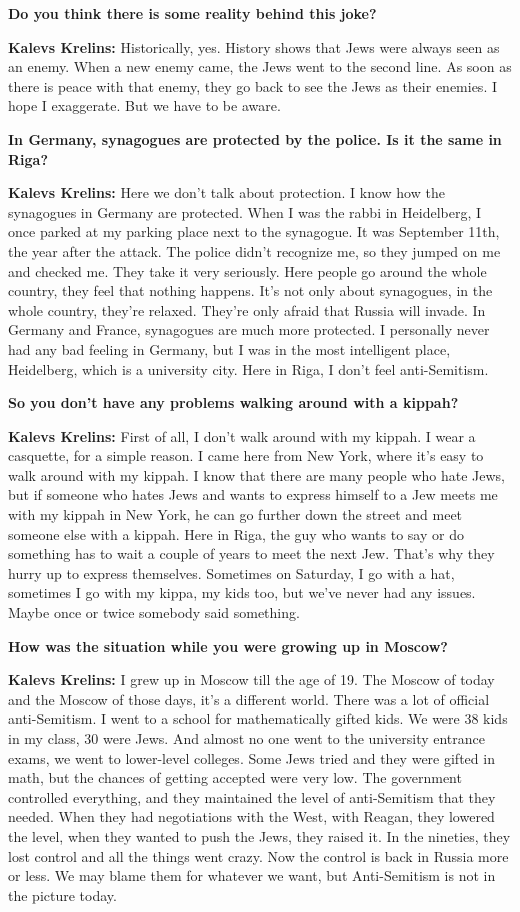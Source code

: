 \textbf{Do you think there is some reality behind this joke?}  

\textbf{Kalevs Krelins:} Historically, yes. History shows that Jews were always seen as an enemy. When a new enemy came, the Jews went to the second line. As soon as there is peace with that enemy, they go back to see the Jews as their enemies. I hope I exaggerate. But we have to be aware. 

\textbf{In Germany, synagogues are protected by the police. Is it the same in Riga?} 

\textbf{Kalevs Krelins:} Here we don’t talk about protection. I know how the synagogues in Germany are protected. When I was the rabbi in Heidelberg, I once parked at my parking place next to the synagogue. It was September 11th, the year after the attack. The police didn’t recognize me, so they jumped on me and checked me. They take it very seriously. Here people go around the whole country, they feel that nothing happens. It’s not only about synagogues, in the whole country, they're relaxed. They’re only afraid that Russia will invade. In Germany and France, synagogues are much more protected. I personally never had any bad feeling in Germany, but I was in the most intelligent place, Heidelberg, which is a university city. Here in Riga, I don’t feel anti-Semitism.  

\textbf{So you don’t have any problems walking around with a kippah?} 

\textbf{Kalevs Krelins:} First of all, I don't walk around with my kippah. I wear a casquette, for a simple reason. I came here from New York, where it’s easy to walk around with my kippah. I know that there are many people who hate Jews, but if someone who hates Jews and wants to express himself to a Jew meets me with my kippah in New York, he can go further down the street and meet someone else with a kippah. Here in Riga, the guy who wants to say or do something has to wait a couple of years to meet the next Jew. That’s why they hurry up to express themselves. Sometimes on Saturday, I go with a hat, sometimes I go with my kippa, my kids too, but we've never had any issues. Maybe once or twice somebody said something. 

\textbf{How was the situation while you were growing up in Moscow?} 

\textbf{Kalevs Krelins:} I grew up in Moscow till the age of 19. The Moscow of today and the Moscow of those days, it's a different world. There was a lot of official anti-Semitism. I went to a school for mathematically gifted kids. We were 38 kids in my class, 30 were Jews. And almost no one went to the university entrance exams, we went to lower-level colleges. Some Jews tried and they were gifted in math, but the chances of getting accepted were very low. The government controlled everything, and they maintained the level of anti-Semitism that they needed. When they had negotiations with the West, with Reagan, they lowered the level, when they wanted to push the Jews, they raised it. In the nineties, they lost control and all the things went crazy. Now the control is back in Russia more or less. We may blame them for whatever we want, but Anti-Semitism is not in the picture today. 

